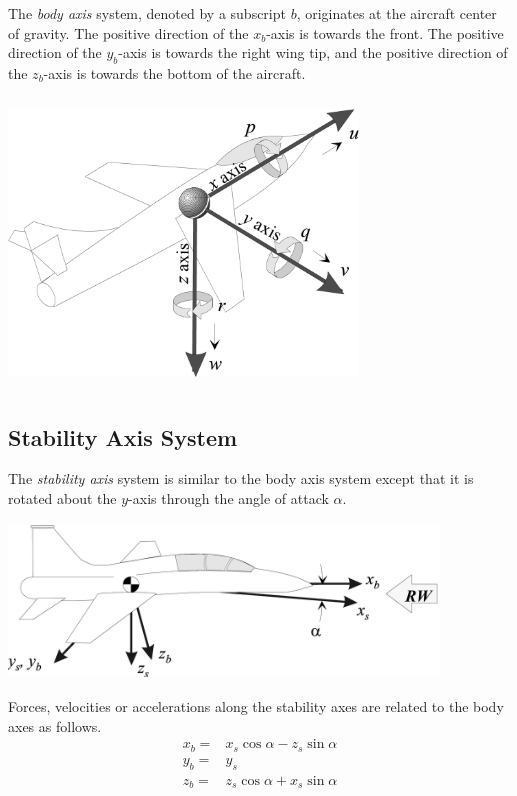 \documentclass[
]{book}
\begin{document}
The \emph{body axis} system, denoted by a subscript \(b\), originates at the aircraft center of gravity. The positive direction of the \(x_b\)-axis is towards the front. The positive direction of the \(y_b\)-axis is towards the right wing tip, and the positive direction of the \(z_b\)-axis is towards the bottom of the aircraft.

\includegraphics[width=3.65625in,height=3.03125in]{media/06/image2.svg}

\hypertarget{stability-axis-system}{%
\subsection{Stability Axis System}\label{stability-axis-system}}

The \emph{stability axis} system is similar to the body axis system except that it is rotated about the \(y\)-axis through the angle of attack \(\alpha\).

\includegraphics[width=4.5in,height=1.625in]{media/06/image4.svg}

Forces, velocities or accelerations along the stability axes are related to the body axes as follows.
\begin{align}
x_b =& x_s \cos \alpha − z_s \sin \alpha \\
y_b =& y_s \\
z_b =& z_s \cos \alpha + x_s \sin \alpha
\end{align}
\end{document}
